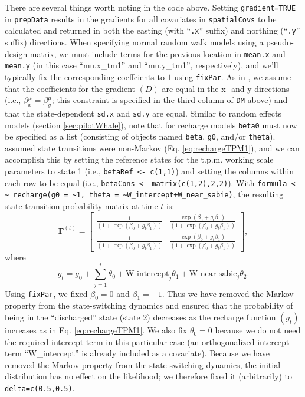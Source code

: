 \documentclass[12pt]{article}\usepackage[]{graphicx}\usepackage[]{xcolor}
\begin{document}
\noindent There are several things worth noting in the code above. Setting \verb|gradient=TRUE| in \verb|prepData| results in the gradients for all covariates in \verb|spatialCovs| to be calculated and returned in both the easting (with ``\verb|.x|'' suffix) and northing (``\verb|.y|'' suffix) directions. When specifying normal random walk models using a pseudo-design matrix, we must include terms for the previous location in \verb|mean.x| and \verb|mean.y| (in this case ``mu.x\_tm1'' and ``mu.y\_tm1'', respectively), and we'll typically fix the corresponding coeffcients to $1$ using \verb|fixPar|. As in \cite{HootenEtAl2019}, we assume that the coefficients for the gradient $(D)$ are equal in the x- and y-directions (i.e., $\beta^\mu_x = \beta^\mu_y$; this constraint is specified in the third column of \verb|DM| above) and that the state-dependent \verb|sd.x| and \verb|sd.y| are equal. Similar to random effects models (section \ref{sec:pilotWhale}), note that for recharge models \verb|beta0| must now be specified as a list (consisting of objects named \verb|beta|, \verb|g0|, and/or \verb|theta|). \cite{HootenEtAl2019} assumed state transitions were non-Markov (Eq. \ref{eq:rechargeTPM1}), and we can accomplish this by setting the reference states for the t.p.m. working scale parameters to state 1 (i.e., \verb|betaRef <- c(1,1)|) and setting the columns within each row to be equal (i.e., \verb|betaCons <- matrix(c(1,2),2,2)|). With \verb|formula <- ~ recharge(g0 = ~1, theta = ~W_intercept+W_near_sabie)|, the resulting state transition probability matrix at time $t$ is:
\begin{equation*}
  {\mathbf \Gamma^{(t)}} = \begin{bmatrix}
    \frac{1}{(1+\exp(\beta_0+g_t\beta_1))} & \frac{\exp(\beta_0+g_t\beta_1)}{(1+\exp(\beta_0+g_t\beta_1))}  \\
    \frac{1}{(1+\exp(\beta_0+g_t\beta_1))} & \frac{\exp(\beta_0+g_t\beta_1)}{(1+\exp(\beta_0+g_t\beta_1))}   
  \end{bmatrix},
\end{equation*}
where
\begin{equation*}
  g_t = g_0 + \sum_{j=1}^t \theta_0 + \text{W\_intercept}_j \theta_1 + \text{W\_near\_sabie}_j \theta_2.
\end{equation*}
Using \verb|fixPar|, we fixed $\beta_0=0$ and $\beta_1=-1$. Thus we have removed the Markov property from the state-switching dynamics and ensured that the probability of being in the ``discharged'' state (state 2) decreases as the recharge function $(g_t)$ increases as in Eq. \ref{eq:rechargeTPM1}. We also fix $\theta_0=0$ because we do not need the required intercept term in this particular case (an orthogonalized intercept term ``W\_intercept'' is already included as a covariate). Because we have removed the Markov property from the state-switching dynamics, the initial distribution has no effect on the likelihood; we therefore fixed it (arbitrarily) to \verb|delta=c(0.5,0.5)|.
\end{document}
